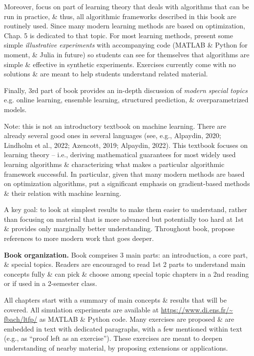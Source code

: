 \documentclass{article}
\begin{document}
\begin{enumerate}
	Moreover, focus on part of learning theory that deals with algorithms that can be run in practice, \& thus, all algorithmic frameworks described in this book are routinely used. Since many modern learning methods are based on optimization, Chap. 5 is dedicated to that topic. For most learning methods, present some simple {\it illustrative experiments} with accompanying code (MATLAB \& Python for moment, \& Julia in future) so students can see for themselves that algorithms are simple \& effective in synthetic experiments. Exercises currently come with no solutions \& are meant to help students understand related material.
	
	Finally, 3rd part of book provides an in-depth discussion of {\it modern special topics} e.g. online learning, ensemble learning, structured prediction, \& overparametrized models.
	
	Note: this is not an introductory textbook on machine learning. There are already several good ones in several languages (see, e.g., Alpaydin, 2020; Lindholm et al., 2022; Azencott, 2019; Alpaydin, 2022). This textbook focuses on learning theory -- i.e., deriving mathematical guarantees for most widely used learning algorithms \& characterizing what makes a particular algorithmic framework successful. In particular, given that many modern methods are based on optimization algorithms, put a significant emphasis on gradient-based methods \& their relation with machine learning.
	
	A key goal: to look at simplest results to make them easier to understand, rather than focusing on material that is more advanced but potentially too hard at 1st \& provides only marginally better understanding. Throughout book, propose references to more modern work that goes deeper.
	
	{\bf Book organization.} Book comprises 3 main parts: an introduction, a core part, \& special topics. Readers are encouraged to read 1st 2 parts to understand main concepts fully \& can pick \& choose among special topic chapters in a 2nd reading or if used in a 2-semester class.
	
	All chapters start with a summary of main concepts \& results that will be covered. All simulation experiments are available at \url{https://www.di.ens.fr/~ fbach/ltfp/} as MATLAB \& Python code. Many exercises are proposed \& are embedded in text with dedicated paragraphs, with a few mentioned within text (e.g., as ``proof left as an exercise''). These exercises are meant to deepen understanding of nearby material, by proposing extensions or applications.
	

\end{enumerate}
\end{document}

